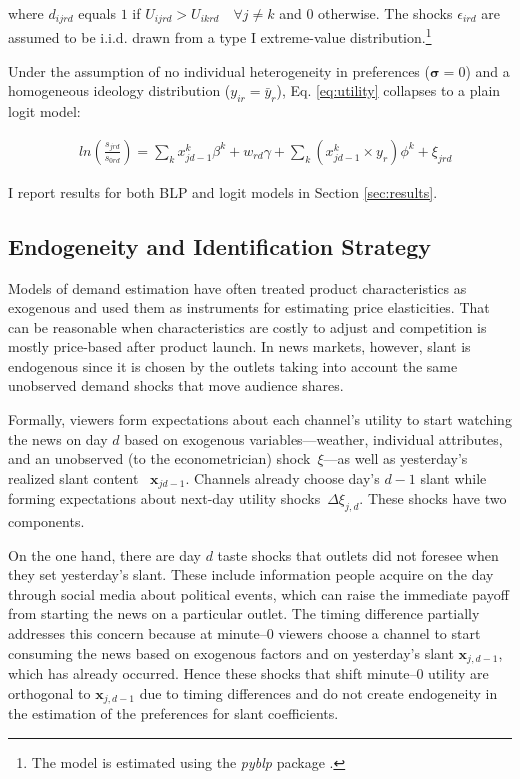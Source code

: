 \documentclass[12pt]{article}
\begin{document}
	where $d_{ijrd}$ equals $1$ if $U_{ijrd}>U_{ikrd} \quad \forall j\neq k$ and $0$ otherwise. The shocks $\epsilon_{ird}$ are assumed to be i.i.d. drawn from a type I extreme-value distribution.\footnote{The model is estimated using the \textit{pyblp} package \citep{conlon2020best}.} 

Under the assumption of no individual heterogeneity in preferences  ($\bm{\sigma}=0$) and a homogeneous ideology distribution ($y_{ir}= \bar{y}_r$),  Eq. \eqref{eq:utility} collapses to a plain logit model: 


\begin{equation}\label{eq:logit}
	\begin{aligned}
		& ln \left(\frac{s_{jrd}}{s_{0rd}}\right)= \sum_k x_{jd-1}^k\beta^k+w_{rd}   \gamma  +\sum_k \left(x_{jd-1}^k\times y_r \right) \phi^k +  \xi_{jrd}
	\end{aligned} 
\end{equation} 


I report results for both  BLP and  logit models in  Section \ref{sec:results}. 
	
	\subsection{Endogeneity and Identification Strategy} \label{sec:endogeneity}
	\label{sec:identification}
	
	
Models of demand estimation have often treated product characteristics as exogenous and used them as instruments for estimating price elasticities. That can be reasonable when characteristics are costly to adjust and competition is mostly price-based after product launch. In news markets, however, slant is endogenous since it is chosen by the outlets taking into account the same unobserved demand shocks that move audience shares.
	
	
	
	Formally, viewers form expectations about each channel’s utility to start watching the news on day $d$ based on exogenous variables—weather, individual attributes, and an unobserved (to the econometrician) shock~$\xi$—as well as yesterday’s  realized slant content ~$\bm{x}_{jd-1}$. Channels already choose day's $d-1$ slant while forming expectations about next-day utility shocks~$\Delta\xi_{j,d}$. These shocks have two components.
	
	
	On the one hand, there are day $d$ taste shocks that outlets did not foresee when they set yesterday's slant.  These include information people acquire on the day through social media about political events, which can raise the immediate payoff from starting the news on a particular outlet. The timing difference partially addresses this concern because at minute–0 viewers choose a channel to start consuming the news based on exogenous factors and on yesterday’s slant $\bm{x}_{j,d-1}$, which has already occurred. Hence these shocks that shift minute–0 utility are orthogonal to $\bm{x}_{j,d-1}$ due to timing differences and do not create endogeneity in the estimation of the preferences for slant coefficients.
	
\end{document}
